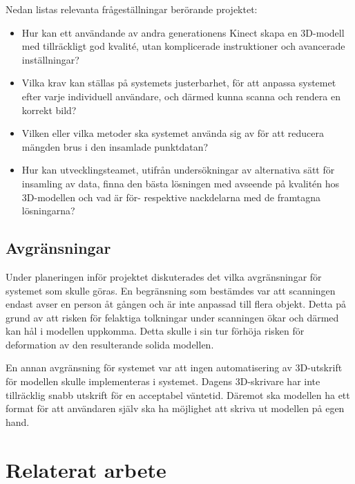 \documentclass[a4paper,12pt,oneside,final]{extbook}
\begin{document}
Nedan listas relevanta frågeställningar berörande projektet:
\begin{itemize}

\item Hur kan ett användande av andra generationens Kinect skapa en 3D-modell med tillräckligt god kvalité, utan komplicerade instruktioner och avancerade inställningar?
\item Vilka krav kan ställas på systemets justerbarhet, för att anpassa systemet efter varje individuell användare, och därmed kunna scanna och rendera en korrekt bild?
\item Vilken eller vilka metoder ska systemet använda sig av för att reducera mängden brus i den insamlade punktdatan?
\item Hur kan utvecklingsteamet, utifrån undersökningar av alternativa sätt för insamling av data, finna den bästa lösningen med avseende på kvalitén hos 3D-modellen och vad är för- respektive nackdelarna med de framtagna lösningarna?

\end{itemize}

\section{Avgränsningar}
Under planeringen inför projektet diskuterades det vilka avgränsningar för systemet som skulle göras. En begränsning som bestämdes var att scanningen endast avser en person åt gången och är inte anpassad till flera objekt. Detta på grund av att risken för felaktiga tolkningar under scanningen ökar och därmed kan hål i modellen uppkomma. Detta skulle i sin tur förhöja risken för deformation av den resulterande solida modellen.

En annan avgränsning för systemet var att ingen automatisering av 3D-utskrift för modellen skulle implementeras i systemet. Dagens 3D-skrivare har inte tillräcklig snabb utskrift för en acceptabel väntetid. Däremot ska modellen ha ett format för att användaren själv ska ha möjlighet att skriva ut modellen på egen hand.

\chapter{Relaterat arbete}
\end{document}
